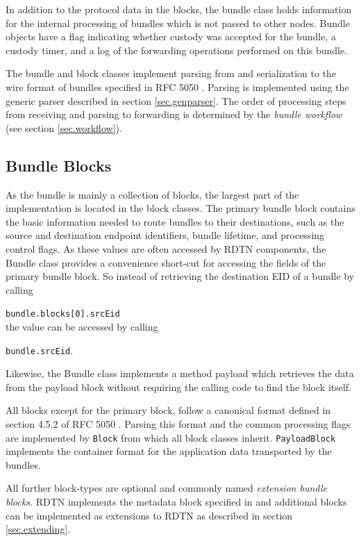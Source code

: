 \documentclass[a4paper]{article}
\begin{document}
In addition to the protocol data in the blocks, the bundle class holds
information for the internal processing of bundles which is not passed to other
nodes.  Bundle objects have a flag indicating whether custody was accepted for
the bundle, a custody timer, and a log of the forwarding operations performed on
this bundle.

The bundle and block classes implement parsing from and serialization to the
wire format of bundles specified in RFC 5050 \cite{bundle-spec}. Parsing is
implemented using the generic parser described in section \ref{sec.genparser}.
The order of processing steps from receiving and parsing to forwarding is
determined by the {\em bundle workflow} (see section \ref{sec.workflow}).

\subsection{Bundle Blocks}\label{sec.bundle-blocks}

As the bundle is mainly a collection of blocks, the largest part of the
implementation is located in the block classes. The primary bundle block
contains the basic information needed to route bundles to their destinations,
such as the source and destination endpoint identifiers, bundle lifetime, and
processing control flags. As these values are often accessed by RDTN components,
the Bundle class provides a convenience short-cut for accessing the fields of
the primary bundle block. So instead of retrieving the destination EID of a
bundle by calling

{\tt bundle.blocks[0].srcEid}\\
the value can be accessed by calling

{\tt bundle.srcEid}.

Likewise, the Bundle class implements a method payload which retrieves the data
from the payload block without requiring the calling code to find the block
itself.

All blocks except for the primary block, follow a canonical format defined in
section 4.5.2 of RFC 5050 \cite{bundle-spec}. Parsing this format and the common
processing flags are implemented by {\tt Block} from which all block classes
inherit.  {\tt PayloadBlock} implements the container format for the application
data transported by the bundles.

All further block-types are optional and commonly named {\em extension bundle
blocks}. RDTN implements the metadata block specified in \cite{metadata-block}
and additional blocks can be implemented as extensions to RDTN as described in
section \ref{sec.extending}.
\end{document}
